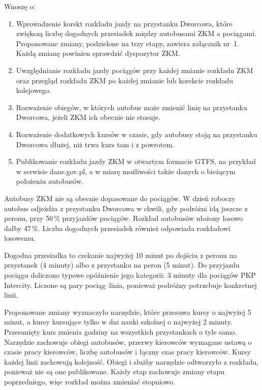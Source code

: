 \documentclass[11pt,a4paper]{article}
\newcommand{\Tytul}[1]{\par\smallskip{\bfseries #1}\par}
\begin{document}
Wnoszę o:
\begin{enumerate}
\item Wprowadzenie korekt rozkładu jazdy na przystanku Dworcowa, które zwiększą liczbę dogodnych przesiadek między autobusami ZKM a pociągami. Proponowane zmiany, podzielone na trzy etapy, zawiera załącznik nr~1. Każdą zmianę powinien sprawdzić dyspozytor ZKM.
\item Uwzględnianie rozkładu jazdy pociągów przy każdej zmianie rozkładu ZKM oraz przegląd rozkładu ZKM po każdej zmianie lub korekcie rozkładu kolejowego.
\item Rozważenie obiegów, w których autobus może zmienić linię na przystanku Dworcowa, jeżeli ZKM ich obecnie nie stosuje.
\item Rozważenie dodatkowych kursów w czasie, gdy autobusy stoją na przystanku Dworcowa dłużej, niż trwa kurs tam i z powrotem.
\item Publikowanie rozkładu jazdy ZKM w otwartym formacie GTFS, na przykład w serwisie dane.gov.pl, a w miarę możliwości także danych o bieżącym położeniu autobusów.
\end{enumerate}

\Tytul{Uzasadnienie}

Autobusy ZKM nie są obecnie dopasowane do pociągów. W dzień roboczy autobus odjeżdża z przystanku Dworcowa w chwili, gdy podróżni idą jeszcze z peronu, przy 50\,\% przyjazdów pociągów. Rozkład autobusów ułożony losowo dałby 47\,\%. Liczba dogodnych przesiadek również odpowiada rozkładowi losowemu.

Dogodna przesiadka to czekanie najwyżej 10 minut po dojściu z peronu na przystanek (4 minuty) albo z przystanku na peron (5 minut). Do przyjazdu pociągu doliczono typowe opóźnienie jego kategorii: 3 minuty dla pociągów PKP Intercity. Liczone są pary pociąg--linia, ponieważ podróżny potrzebuje konkretnej linii.

Proponowane zmiany wyznaczyło narzędzie, które przesuwa kursy o najwyżej 5 minut, a kursy kursujące tylko w dni nauki szkolnej o najwyżej 2 minuty. Przesunięty kurs zmienia godziny na wszystkich przystankach o tyle samo. Narzędzie zachowuje obiegi autobusów, przerwy kierowców wymagane ustawą o czasie pracy kierowców, liczbę autobusów i łączny czas pracy kierowców. Kursy każdej linii zachowują kolejność. Obiegi i służby narzędzie odtworzyło z rozkładu, ponieważ nie są one publikowane. Każdy etap zachowuje zmiany etapu poprzedniego, więc rozkład można zmieniać stopniowo.
\end{document}
